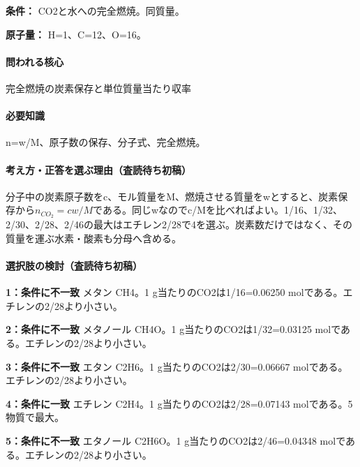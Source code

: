 \noindent\textbf{条件：} CO2と水への完全燃焼。同質量。\par

\noindent\textbf{原子量：} H=\allowbreak{}1、C=\allowbreak{}12、O=\allowbreak{}16。\par

\paragraph{問われる核心} 完全燃焼の炭素保存と単位質量当たり収率

\paragraph{必要知識} n=\allowbreak{}w/M、原子数の保存、分子式、完全燃焼。

\paragraph{考え方・正答を選ぶ理由（査読待ち初稿）} 分子中の炭素原子数をc、モル質量をM、燃焼させる質量をwとすると、炭素保存から\(n_{CO_2}=c w/M\)である。同じwなのでc/Mを比べればよい。1/16、1/32、2/30、2/28、2/46の最大はエチレン2/28で4を選ぶ。炭素数だけではなく、その質量を運ぶ水素・酸素も分母へ含める。

\paragraph{選択肢の検討（査読待ち初稿）}\mbox{}\par

\noindent\textbf{1：条件に不一致} メタン CH4。1 g当たりのCO2は1/16=\allowbreak{}0.06250 molである。エチレンの2/28より小さい。\par

\noindent\textbf{2：条件に不一致} メタノール CH4O。1 g当たりのCO2は1/32=\allowbreak{}0.03125 molである。エチレンの2/28より小さい。\par

\noindent\textbf{3：条件に不一致} エタン C2H6。1 g当たりのCO2は2/30=\allowbreak{}0.06667 molである。エチレンの2/28より小さい。\par

\noindent\textbf{4：条件に一致} エチレン C2H4。1 g当たりのCO2は2/28=\allowbreak{}0.07143 molである。5物質で最大。\par

\noindent\textbf{5：条件に不一致} エタノール C2H6O。1 g当たりのCO2は2/46=\allowbreak{}0.04348 molである。エチレンの2/28より小さい。\par

